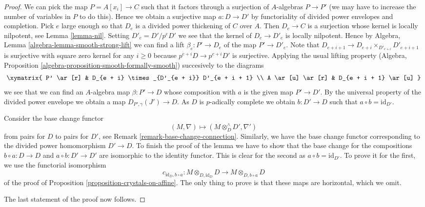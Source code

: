 \begin{proof}
We can pick the map $P = A[x_i] \to C$ such that it factors through
a surjection of $A$-algebras $P \to P'$ (we may have to increase the
number of variables in $P$ to do this). Hence we obtain a surjective
map $a : D \to D'$ by functoriality of divided power envelopes and
completion. Pick $e$ large enough so that $D_e$ is a divided power
thickening of $C$ over $A$. Then $D_e \to C$ is a surjection whose kernel
is locally nilpotent, see Lemma \ref{lemma-nil}. Setting $D'_e = D'/p^eD'$
we see that the kernel of $D_e \to D'_e$ is locally nilpotent.
Hence by Algebra, Lemma \ref{algebra-lemma-smooth-strong-lift}
we can find a lift $\beta_e : P' \to D_e$ of the map $P' \to D'_e$.
Note that $D_{e + i + 1} \to D_{e + i} \times_{D'_{e + i}} D'_{e + i + 1}$
is surjective with square zero kernel for any $i \geq 0$ because
$p^{e + i}D \to p^{e + i}D'$ is surjective. Applying the usual lifting
property (Algebra, Proposition \ref{algebra-proposition-smooth-formally-smooth})
succesively to the diagrams
$$
\xymatrix{
P' \ar[r] & D_{e + i} \times_{D'_{e + i}} D'_{e + i + 1} \\
A \ar[u] \ar[r] & D_{e + i + 1} \ar[u]
}
$$
we see that we can find an $A$-algebra map $\beta : P' \to D$ whose
composition with $a$ is the given map $P' \to D'$.
By the universal property of the divided power envelope we obtain a
map $D_{P', \gamma}(J') \to D$. As $D$ is $p$-adically complete we
obtain $b : D' \to D$ such that $a \circ b = \text{id}_{D'}$.

\medskip\noindent
Consider the base change functor
$$
(M, \nabla) \longmapsto
(M \otimes^\wedge_D D', \nabla')
$$
from pairs for $D$ to pairs for $D'$, see
Remark \ref{remark-base-change-connection}.
Similarly, we have the base change functor corresponding to the divided
power homomorphism $D' \to D$. To finish the proof of the lemma we have
to show that the base change for the compositions $b \circ a : D \to D$
and $a \circ b : D' \to D'$ are isomorphic to the identity functor.
This is clear for the second as $a \circ b = \text{id}_{D'}$.
To prove it for the first, we use the functorial isomorphism
$$
c_{\text{id}_D, b \circ a} :
M \otimes_{D, \text{id}_D} D
\longrightarrow
M \otimes_{D, b \circ a} D
$$
of the proof of Proposition \ref{proposition-crystals-on-affine}.
The only thing to prove is that these maps are horizontal, which we omit.

\medskip\noindent
The last statement of the proof now follows.
\end{proof}

